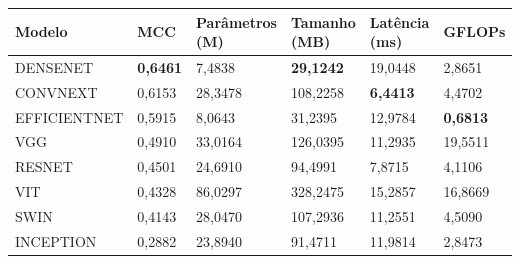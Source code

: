 \begin{tabular}{llllll}
\toprule
Modelo & MCC & Parâmetros (M) & Tamanho (MB) & Latência (ms) & GFLOPs \\
\midrule
DENSENET & \textbf{0,6461} & 7,4838 & \textbf{29,1242} & 19,0448 & 2,8651 \\
CONVNEXT & 0,6153 & 28,3478 & 108,2258 & \textbf{6,4413} & 4,4702 \\
EFFICIENTNET & 0,5915 & 8,0643 & 31,2395 & 12,9784 & \textbf{0,6813} \\
VGG & 0,4910 & 33,0164 & 126,0395 & 11,2935 & 19,5511 \\
RESNET & 0,4501 & 24,6910 & 94,4991 & 7,8715 & 4,1106 \\
VIT & 0,4328 & 86,0297 & 328,2475 & 15,2857 & 16,8669 \\
SWIN & 0,4143 & 28,0470 & 107,2936 & 11,2551 & 4,5090 \\
INCEPTION & 0,2882 & 23,8940 & 91,4711 & 11,9814 & 2,8473 \\
\bottomrule
\end{tabular}
